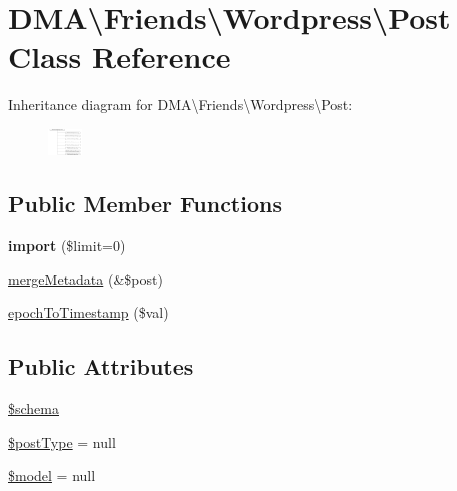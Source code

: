\hypertarget{classDMA_1_1Friends_1_1Wordpress_1_1Post}{\section{D\-M\-A\textbackslash{}Friends\textbackslash{}Wordpress\textbackslash{}Post Class Reference}
\label{classDMA_1_1Friends_1_1Wordpress_1_1Post}
}
Inheritance diagram for D\-M\-A\textbackslash{}Friends\textbackslash{}Wordpress\textbackslash{}Post\-:\begin{figure}[H]
\begin{center}
\leavevmode
\includegraphics[height=0.701754cm]{d2/de2/classDMA_1_1Friends_1_1Wordpress_1_1Post}
\end{center}
\end{figure}
\subsection*{Public Member Functions}
\begin{DoxyCompactItemize}
\item 
\hypertarget{classDMA_1_1Friends_1_1Wordpress_1_1Post_a4eb2c6b3e89a43b3221e9e2564059510}{{\bfseries import} (\$limit=0)}\label{classDMA_1_1Friends_1_1Wordpress_1_1Post_a4eb2c6b3e89a43b3221e9e2564059510}

\item 
\hyperlink{classDMA_1_1Friends_1_1Wordpress_1_1Post_adb1c6652d06b360d1f81d14dde95b5b1}{merge\-Metadata} (\&\$post)
\item 
\hyperlink{classDMA_1_1Friends_1_1Wordpress_1_1Post_af6960d9c63c4224f6f481c88d2b5d076}{epoch\-To\-Timestamp} (\$val)
\end{DoxyCompactItemize}
\subsection*{Public Attributes}
\begin{DoxyCompactItemize}
\item 
\hyperlink{classDMA_1_1Friends_1_1Wordpress_1_1Post_a38fc35f2a6a04046e386cfd3f3564d89}{\$schema}
\item 
\hyperlink{classDMA_1_1Friends_1_1Wordpress_1_1Post_a9b0ea251e8ba6b7161fc51ffa8fb72d8}{\$post\-Type} = null
\item 
\hyperlink{classDMA_1_1Friends_1_1Wordpress_1_1Post_a8a3df2e9db7f90d348d27ea9354176b1}{\$model} = null
\end{DoxyCompactItemize}

